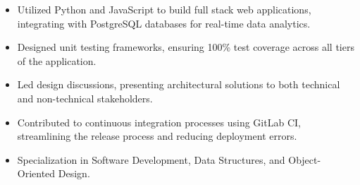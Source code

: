 \par\smallskip
\noindent
\begin{minipage}{20cm}
  \begin{minipage}{9.75cm}
    \begin{itemize}
      \item Utilized Python and JavaScript to build full stack web applications, integrating with PostgreSQL databases for real-time data analytics.
      \item Designed unit testing frameworks, ensuring 100\% test coverage across all tiers of the application.
    \end{itemize}
  \end{minipage}
  \hfill
  \begin{minipage}{9.75cm}
    \begin{itemize}
      \item Led design discussions, presenting architectural solutions to both technical and non-technical stakeholders.
      \item Contributed to continuous integration processes using GitLab CI, streamlining the release process and reducing deployment errors.
    \end{itemize}
  \end{minipage}
\end{minipage}

\begin{itemize}
  \item Specialization in Software Development, Data Structures, and Object-Oriented Design.
\end{itemize}

\noindent
\begin{minipage}{20cm}
\end{minipage}


